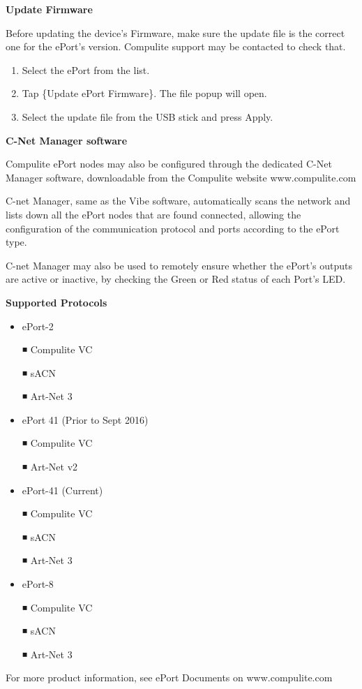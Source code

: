 \documentclass[
]{article}
\begin{document}
\textbf{Update Firmware}

Before updating the device's Firmware, make sure the update file is the correct one for the ePort's version. Compulite support may be contacted to check that.

\begin{enumerate}
\def\labelenumi{\arabic{enumi}.}
\item
  Select the ePort from the list.
\item
  Tap \{Update ePort Firmware\}. The file popup will open.
\item
  Select the update file from the USB stick and press Apply.
\end{enumerate}

\textbf{C-Net Manager software}

Compulite ePort nodes may also be configured through the dedicated C-Net Manager software, downloadable from the Compulite website www.compulite.com

C-net Manager, same as the Vibe software, automatically scans the network and lists down all the ePort nodes that are found connected, allowing the configuration of the communication protocol and ports according to the ePort type.

C-net Manager may also be used to remotely ensure whether the ePort's outputs are active or inactive, by checking the Green or Red status of each Port's LED.

\textbf{Supported Protocols}

\begin{itemize}
\item
  ePort-2

  ◾ Compulite VC

  ◾ sACN

  ◾ Art-Net 3
\item
  ePort 41 (Prior to Sept 2016)

  ◾ Compulite VC

  ◾ Art-Net v2
\item
  ePort-41 (Current)

  ◾ Compulite VC

  ◾ sACN

  ◾ Art-Net 3
\item
  ePort-8

  ◾ Compulite VC

  ◾ sACN

  ◾ Art-Net 3
\end{itemize}

For more product information, see ePort Documents on www.compulite.com
\end{document}
